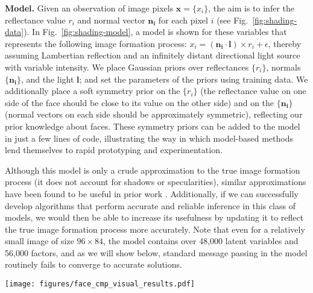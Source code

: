 \textbf{Model.} Given an observation of image pixels $\mathbf{x} = \{x_i\}$, the aim is to infer the reflectance value $r_i$ and normal vector $\mathbf{n_i}$ for each pixel $i$ (see Fig.~\ref{fig:shading-data}). In Fig.~\ref{fig:shading-model}, a model is shown for these variables that represents the following image formation process: $x_i = (\mathbf{n_i} \cdot \mathbf{l}) \times r_i + \epsilon$, thereby assuming Lambertian reflection and an infinitely distant directional light source with variable intensity. We place Gaussian priors over reflectances $\{ r_i \}$, normals $\{ \mathbf{n_i} \}$, and the light $\mathbf{l}$; and set the parameters of the priors using training data. We additionally place a soft symmetry prior on the $\{ r_i \}$ (the reflectance value on one side of the face should be close to its value on the other side) and on the $\{ \mathbf{n_i} \}$ (normal vectors on each side should be approximately symmetric), reflecting our prior knowledge about faces. These symmetry priors can be added to the model in just a few lines of code, illustrating the way in which model-based methods lend themselves to rapid prototyping and experimentation.

Although this model is only a crude approximation to the true image formation process (\eg it does not account for shadows or specularities), similar approximations have been found to be useful in prior work \citep{Biswas2009, Biswas2010, Kemelmacher2011}. Additionally, if we can successfully develop algorithms that perform accurate and reliable inference in this class of models, we would then be able to increase its usefulness by updating it to reflect the true image formation process more accurately. Note that even for a relatively small image of size $96 \times 84$, the model contains over 48,000 latent variables and 56,000 factors, and as we will show below, standard message passing in the model routinely fails to converge to accurate solutions.

\begin{figure*}
\begin{center}
\centerline{\texttt{[image: figures/face\_cmp\_visual\_results.pdf]}}
\vspace{-1.2cm}
\end{center}
	\label{fig:shading-qualitative-multiple-subjects}
\end{figure*}

